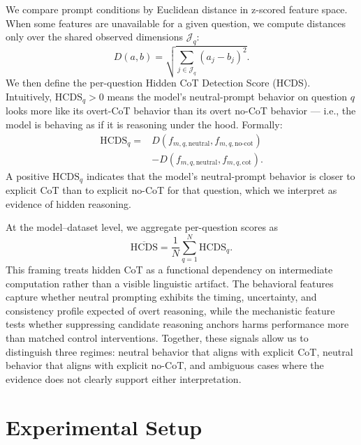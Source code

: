 \documentclass{article}
\theoremstyle{plain}
\theoremstyle{definition}
\theoremstyle{remark}
\begin{document}
We compare prompt conditions by Euclidean distance in z-scored feature space. When some features are unavailable for a given question, we compute distances only over the shared observed dimensions $\mathcal{J}_q$:
\[
D(a,b) = \sqrt{\sum_{j \in \mathcal{J}_q} (a_j - b_j)^2}.
\]
We then define the per-question Hidden CoT Detection Score (HCDS). Intuitively, $\mathrm{HCDS}_q > 0$ means the model's neutral-prompt behavior on question $q$ looks more like its overt-CoT behavior than its overt no-CoT behavior --- i.e., the model is behaving as if it is reasoning under the hood. Formally:
\begin{equation}
\begin{aligned}
\mathrm{HCDS}_q ={}& D\!\left(f_{m,q,\mathrm{neutral}}, f_{m,q,\mathrm{no\text{-}cot}}\right) \\
&- D\!\left(f_{m,q,\mathrm{neutral}}, f_{m,q,\mathrm{cot}}\right).
\end{aligned}
\label{eq:hcds-q}
\end{equation}
A positive $\mathrm{HCDS}_q$ indicates that the model's neutral-prompt behavior is closer to explicit CoT than to explicit no-CoT for that question, which we interpret as evidence of hidden reasoning.

At the model--dataset level, we aggregate per-question scores as
\begin{equation}
\overline{\mathrm{HCDS}} = \frac{1}{N}\sum_{q=1}^{N} \mathrm{HCDS}_q.
\label{eq:hcds-mean}
\end{equation}
This framing treats hidden CoT as a functional dependency on intermediate computation rather than a visible linguistic artifact. The behavioral features capture whether neutral prompting exhibits the timing, uncertainty, and consistency profile expected of overt reasoning, while the mechanistic feature tests whether suppressing candidate reasoning anchors harms performance more than matched control interventions. Together, these signals allow us to distinguish three regimes: neutral behavior that aligns with explicit CoT, neutral behavior that aligns with explicit no-CoT, and ambiguous cases where the evidence does not clearly support either interpretation.

\section{Experimental Setup}
\end{document}
